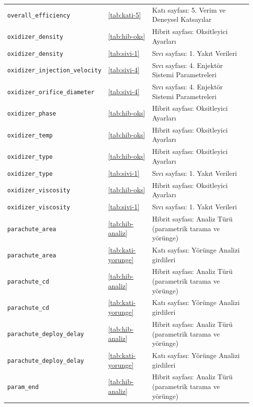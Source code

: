 \documentclass[11pt,a4paper]{article}
\begin{document}
{\begin{longtable}{@{}>{\raggedright\arraybackslash}p{5.2cm}p{1.4cm}>{\raggedright\arraybackslash}p{7.4cm}@{}}
\texttt{overall\_\allowbreak{}efficiency} & \ref{tab:kati-5} & Katı sayfası: 5. Verim ve Deneysel Katsayılar \\
\texttt{oxidizer\_\allowbreak{}density} & \ref{tab:hib-oks} & Hibrit sayfası: Oksitleyici Ayarları \\
\texttt{oxidizer\_\allowbreak{}density} & \ref{tab:sivi-1} & Sıvı sayfası: 1. Yakıt Verileri \\
\texttt{oxidizer\_\allowbreak{}injection\_\allowbreak{}velocity} & \ref{tab:sivi-4} & Sıvı sayfası: 4. Enjektör Sistemi Parametreleri \\
\texttt{oxidizer\_\allowbreak{}orifice\_\allowbreak{}diameter} & \ref{tab:sivi-4} & Sıvı sayfası: 4. Enjektör Sistemi Parametreleri \\
\texttt{oxidizer\_\allowbreak{}phase} & \ref{tab:hib-oks} & Hibrit sayfası: Oksitleyici Ayarları \\
\texttt{oxidizer\_\allowbreak{}temp} & \ref{tab:hib-oks} & Hibrit sayfası: Oksitleyici Ayarları \\
\texttt{oxidizer\_\allowbreak{}type} & \ref{tab:hib-oks} & Hibrit sayfası: Oksitleyici Ayarları \\
\texttt{oxidizer\_\allowbreak{}type} & \ref{tab:sivi-1} & Sıvı sayfası: 1. Yakıt Verileri \\
\texttt{oxidizer\_\allowbreak{}viscosity} & \ref{tab:hib-oks} & Hibrit sayfası: Oksitleyici Ayarları \\
\texttt{oxidizer\_\allowbreak{}viscosity} & \ref{tab:sivi-1} & Sıvı sayfası: 1. Yakıt Verileri \\
\texttt{parachute\_\allowbreak{}area} & \ref{tab:hib-analiz} & Hibrit sayfası: Analiz Türü (parametrik tarama ve yörünge) \\
\texttt{parachute\_\allowbreak{}area} & \ref{tab:kati-yorunge} & Katı sayfası: Yörünge Analizi girdileri \\
\texttt{parachute\_\allowbreak{}cd} & \ref{tab:hib-analiz} & Hibrit sayfası: Analiz Türü (parametrik tarama ve yörünge) \\
\texttt{parachute\_\allowbreak{}cd} & \ref{tab:kati-yorunge} & Katı sayfası: Yörünge Analizi girdileri \\
\texttt{parachute\_\allowbreak{}deploy\_\allowbreak{}delay} & \ref{tab:hib-analiz} & Hibrit sayfası: Analiz Türü (parametrik tarama ve yörünge) \\
\texttt{parachute\_\allowbreak{}deploy\_\allowbreak{}delay} & \ref{tab:kati-yorunge} & Katı sayfası: Yörünge Analizi girdileri \\
\texttt{param\_\allowbreak{}end} & \ref{tab:hib-analiz} & Hibrit sayfası: Analiz Türü (parametrik tarama ve yörünge) \\

\end{longtable}}
\end{document}
